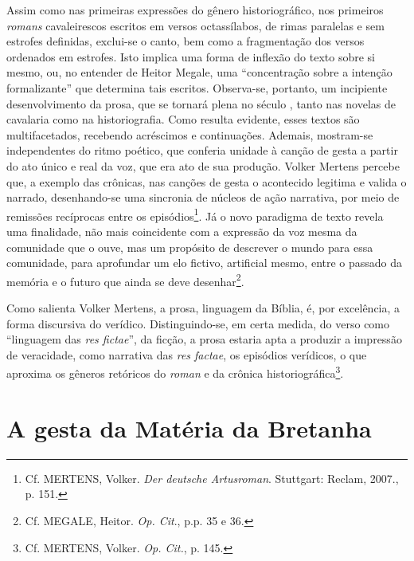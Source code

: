 Assim como nas primeiras expressões do gênero historiográfico, nos primeiros
\textit{romans} cavaleirescos escritos em versos octassílabos, de rimas
paralelas e sem estrofes definidas, exclui-se o canto, bem como a fragmentação
dos versos ordenados em estrofes. Isto implica uma forma de inflexão do texto
sobre si mesmo, ou, no entender de Heitor Megale, uma “concentração sobre a
intenção formalizante” que determina tais escritos. Observa-se, portanto, um
incipiente desenvolvimento da prosa, que se tornará plena no século , tanto
nas novelas de cavalaria como na historiografia. Como resulta evidente, esses
textos são multifacetados, recebendo acréscimos e continuações. Ademais,
mostram-se independentes do ritmo poético, que conferia unidade à canção de
gesta a partir do ato único e real da voz, que era ato de sua produção. Volker
Mertens percebe que, a exemplo das crônicas, nas canções de gesta o acontecido
legitima e valida o narrado, desenhando-se uma sincronia de núcleos de ação
narrativa, por meio de remissões recíprocas entre os episódios\footnote{ Cf.
MERTENS, Volker. \textit{Der deutsche Artusroman}. Stuttgart: Reclam, 2007., p.
151. }. Já o novo paradigma de texto revela uma finalidade, não mais
coincidente com a expressão da voz mesma da comunidade que o ouve, mas um
propósito de descrever o mundo para essa comunidade, para aprofundar um elo
fictivo, artificial mesmo, entre o passado da memória e o futuro que ainda se
deve desenhar\footnote{ Cf. MEGALE, Heitor. \textit{Op. Cit}., p.p. 35 e 36.}. 

Como salienta Volker Mertens, a prosa, linguagem da Bíblia, é, por excelência, a
forma discursiva do verídico. Distinguindo-se, em certa medida, do verso como
“linguagem das \textit{res fictae}”, da ficção, a prosa estaria apta a produzir
a impressão de veracidade, como narrativa das \textit{res factae}, os episódios
verídicos, o que aproxima os gêneros retóricos do \textit{roman} e da crônica
historiográfica\footnote{ Cf. MERTENS, Volker.\textit{ Op. Cit.}, p. 145. }. 

\section{A gesta da Matéria da Bretanha}

